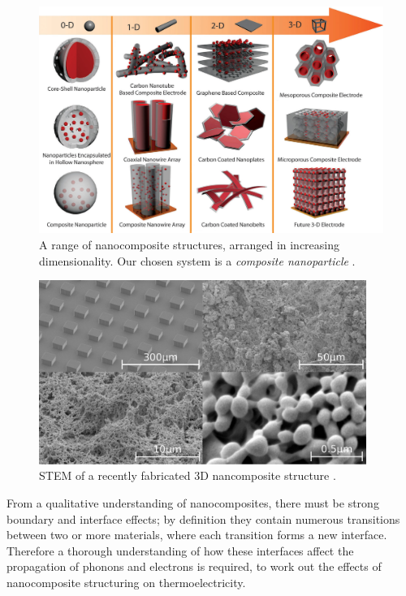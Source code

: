 \documentclass[12pt]{article}
\begin{document}
\begin{figure}
	\centering
	\includegraphics[width=\textwidth]{nanocomposite-structures.png}
	\caption{A range of nanocomposite structures, arranged in increasing dimensionality. Our chosen system is a \emph{composite nanoparticle} \cite{nanowires}.}
	\label{fig:nanocomposite-structures}
\end{figure}

\begin{figure}
	\centering
	\includegraphics[width=0.95\textwidth]{stem-pillar-composites-edit.pdf}
	\caption{STEM of a recently fabricated 3D nancomposite structure \cite{minnich-review}.}
	\label{fig:nanopillars}
\end{figure}

From a qualitative understanding of nanocomposites, there must be strong boundary and interface effects; by definition they contain numerous transitions between two or more materials, where each transition forms a new interface. Therefore a thorough understanding of how these interfaces affect the propagation of phonons and electrons is required, to work out the effects of nanocomposite structuring on thermoelectricity.
\end{document}
